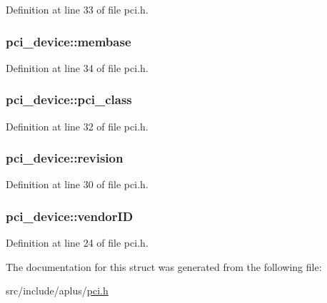 Definition at line 33 of file pci.\+h.

\hypertarget{structpci__device_a795ff4e1dc77af09805c41d96766b64b}{
\subsubsection[{membase}]{ pci\+\_\+device\+::membase}}\label{structpci__device_a795ff4e1dc77af09805c41d96766b64b}


Definition at line 34 of file pci.\+h.

\hypertarget{structpci__device_ae1867eca43c8f867951963a1753649ea}{
\subsubsection[{pci\+\_\+class}]{ pci\+\_\+device\+::pci\+\_\+class}}\label{structpci__device_ae1867eca43c8f867951963a1753649ea}


Definition at line 32 of file pci.\+h.

\hypertarget{structpci__device_ad6450a83a220d2015cb94a9698580668}{
\subsubsection[{revision}]{ pci\+\_\+device\+::revision}}\label{structpci__device_ad6450a83a220d2015cb94a9698580668}


Definition at line 30 of file pci.\+h.

\hypertarget{structpci__device_ac9682451216985995a3601f14239dc26}{
\subsubsection[{vendor\+I\+D}]{ pci\+\_\+device\+::vendor\+I\+D}}\label{structpci__device_ac9682451216985995a3601f14239dc26}


Definition at line 24 of file pci.\+h.



The documentation for this struct was generated from the following file\+:\begin{DoxyCompactItemize}
\item 
src/include/aplus/\hyperlink{pci_8h}{pci.\+h}\end{DoxyCompactItemize}
